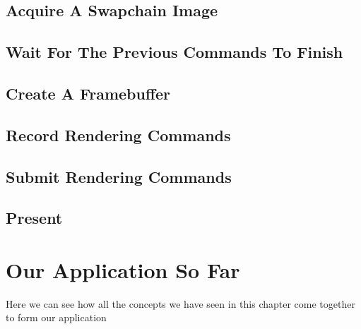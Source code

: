 \subsection{Acquire A Swapchain Image}

\subsection{Wait For The Previous Commands To Finish}

\subsection{Create A Framebuffer}

\subsection{Record Rendering Commands}

\subsection{Submit Rendering Commands}

\subsection{Present}

\section{Our Application So Far}

Here we can see how all the concepts we have seen in this chapter come together
to form our application

\begin{minipage}{\linewidth}{\noindent}
    
\end{minipage}
